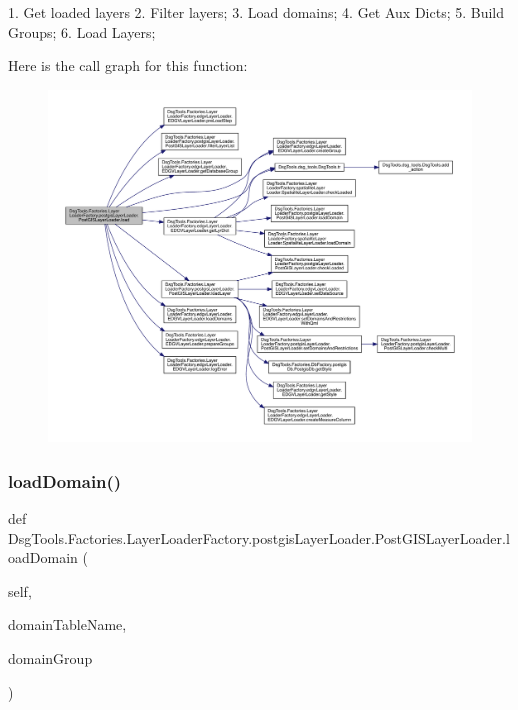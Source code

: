 \begin{DoxyVerb}1. Get loaded layers
2. Filter layers;
3. Load domains;
4. Get Aux Dicts;
5. Build Groups;
6. Load Layers;
\end{DoxyVerb}
 Here is the call graph for this function\+:
\nopagebreak
\begin{figure}[H]
\begin{center}
\leavevmode
\includegraphics[width=350pt]{class_dsg_tools_1_1_factories_1_1_layer_loader_factory_1_1postgis_layer_loader_1_1_post_g_i_s_layer_loader_a289c140dff1ec163fb9de27e9a14c8c9_cgraph}
\end{center}
\end{figure}
\mbox{\label{class_dsg_tools_1_1_factories_1_1_layer_loader_factory_1_1postgis_layer_loader_1_1_post_g_i_s_layer_loader_a337ead19d37879c82f062817fa2110ee}} 
\subsubsection{\texorpdfstring{load\+Domain()}{loadDomain()}}
{\footnotesize\ttfamily def Dsg\+Tools.\+Factories.\+Layer\+Loader\+Factory.\+postgis\+Layer\+Loader.\+Post\+G\+I\+S\+Layer\+Loader.\+load\+Domain (\begin{DoxyParamCaption}\item[{}]{self,  }\item[{}]{domain\+Table\+Name,  }\item[{}]{domain\+Group }\end{DoxyParamCaption})}

